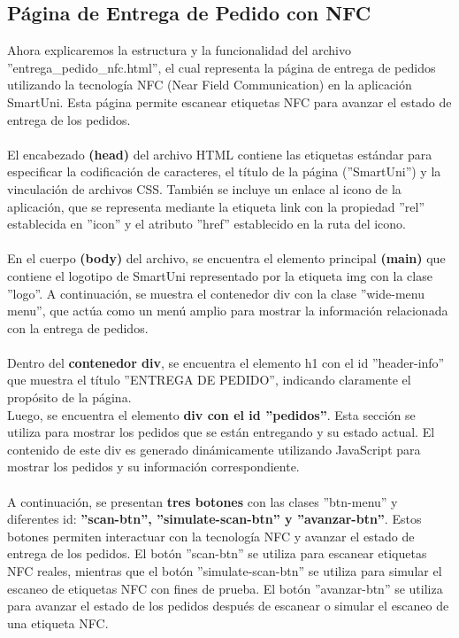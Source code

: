 \documentclass[12pt]{report}
\begin{document}
\subsection{Página de Entrega de Pedido con NFC}
Ahora explicaremos la estructura y la funcionalidad del archivo ''entrega\_pedido\_nfc.html'', el cual representa la página de entrega de pedidos utilizando la tecnología NFC (Near Field Communication) en la aplicación SmartUni. Esta página permite escanear etiquetas NFC para avanzar el estado de entrega de los pedidos.\\\\
El encabezado\textbf{ (head)} del archivo HTML contiene las etiquetas estándar para especificar la codificación de caracteres, el título de la página (''SmartUni'') y la vinculación de archivos CSS. También se incluye un enlace al icono de la aplicación, que se representa mediante la etiqueta link con la propiedad ''rel'' establecida en ''icon'' y el atributo ''href'' establecido en la ruta del icono.
\\\\En el cuerpo \textbf{(body) }del archivo, se encuentra el elemento principal\textbf{ (main)} que contiene el logotipo de SmartUni representado por la etiqueta img con la clase ''logo''. A continuación, se muestra el contenedor div con la clase ''wide-menu menu'', que actúa como un menú amplio para mostrar la información relacionada con la entrega de pedidos.
\\\\Dentro del \textbf{contenedor div}, se encuentra el elemento h1 con el id ''header-info'' que muestra el título ''ENTREGA DE PEDIDO'', indicando claramente el propósito de la página.
\\Luego, se encuentra el elemento \textbf{div con el id ''pedidos''}. Esta sección se utiliza para mostrar los pedidos que se están entregando y su estado actual. El contenido de este div es generado dinámicamente utilizando JavaScript para mostrar los pedidos y su información correspondiente.
\\\\A continuación, se presentan \textbf{tres botones }con las clases ''btn-menu'' y diferentes id: \textbf{''scan-btn'', ''simulate-scan-btn'' y ''avanzar-btn''}. Estos botones permiten interactuar con la tecnología NFC y avanzar el estado de entrega de los pedidos. El botón ''scan-btn'' se utiliza para escanear etiquetas NFC reales, mientras que el botón ''simulate-scan-btn'' se utiliza para simular el escaneo de etiquetas NFC con fines de prueba. El botón ''avanzar-btn'' se utiliza para avanzar el estado de los pedidos después de escanear o simular el escaneo de una etiqueta NFC.
\end{document}
